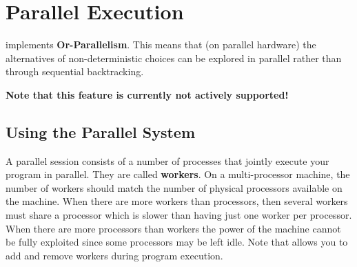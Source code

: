 %
% 
% 
% 
% 
%
%

\chapter{Parallel Execution}
\label{chapparallel}

{\eclipse} implements {\bf Or-Parallelism}.
This means that (on parallel hardware) the alternatives of
non-deterministic choices can be explored in parallel rather
than through sequential backtracking.

{\bf Note that this feature is currently not actively supported!}

\section{Using the Parallel System}
A parallel {\eclipse} session consists of a number of processes that jointly
execute your program in parallel. They are called {\bf workers}.
On a multi-processor machine, the number of workers should match the
number of physical processors available on the machine.
When there are more workers than processors, then several workers
must share a processor which is slower than having just one worker
per processor. When there are more processors than workers the
power of the machine cannot be fully exploited since some processors
may be left idle.
Note that {\eclipse} allows you to add and remove workers during program execution.

